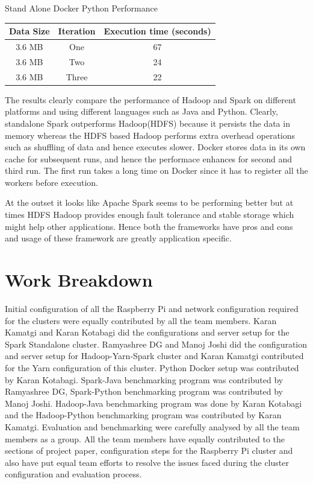 \begin{center}
Stand Alone Docker Python Performance
\end{center}

\begin{center}
    \begin{tabular}{ | c | c | c |}
    \hline
    Data Size & Iteration & Execution time (seconds) \\ \hline
    3.6 MB & One & 67  \\ \hline
    3.6 MB & Two & 24 \\ \hline
    3.6 MB & Three & 22 \\ \hline
    \end{tabular}
\end{center}

The results clearly compare the performance of Hadoop and Spark 
on different platforms and using different languages such as Java and Python. 
Clearly, standalone Spark outperforms Hadoop(HDFS) because it persists 
 the data in memory whereas the HDFS based Hadoop performs extra overhead 
 operations such as shuffling of data and hence executes slower. 
 Docker stores data in its own cache for subsequent runs, and hence the 
 performace enhances for second and third run. The first run takes a long time 
 on Docker since it has to register all the workers before execution.

 At the outset it looks like Apache Spark seems to be performing better but at 
 times HDFS Hadoop provides enough fault tolerance and stable storage which 
 might help other applications. Hence both the frameworks have pros and cons and
 usage of these framework are greatly application specific. 


% 


\section{Work Breakdown}

Initial configuration of all the Raspberry Pi and network configuration 
required for the clusters were equally contributed by all the team members.
Karan Kamatgi and Karan Kotabagi did the configurations and server setup for the
Spark Standalone cluster. Ramyashree DG and Manoj Joshi did the configuration 
and server setup for Hadoop-Yarn-Spark cluster and Karan Kamatgi contributed for
the Yarn configuration of this cluster. Python Docker setup was contributed by 
Karan Kotabagi. Spark-Java benchmarking program was contributed by Ramyashree DG,
Spark-Python benchmarking program was contributed by Manoj Joshi. Hadoop-Java 
benchmarking program was done by Karan Kotabagi and the Hadoop-Python 
benchmarking program was contributed by Karan Kamatgi. Evaluation and 
benchmarking were carefully analysed by all the team members as a group. All the 
team members have equally contributed to the sections of project paper, 
configuration steps for the Raspberry Pi cluster and also have put equal team 
efforts to resolve the issues faced during the cluster configuration and 
evaluation process.







